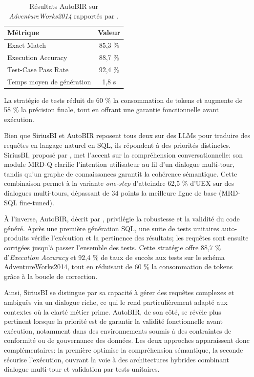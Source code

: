 \documentclass[conference]{IEEEtran}
\begin{document}
\begin{table}[ht]
\centering
\caption{Résultats AutoBIR sur \textit{AdventureWorks2014} rapportés par \citeauthor{busany2024autobir} \citeyearpar{busany2024autobir}.}
\label{tab:autobir-results}
\begin{tabular}{|l|c|}
\hline
\textbf{Métrique} & \textbf{Valeur} \\
\hline
Exact Match                & 85,3 \% \\
Execution Accuracy         & 88,7 \% \\
Test-Case Pass Rate        & 92,4 \% \\
Temps moyen de génération  & 1,8 s \\
\hline
\end{tabular}
\end{table}

La stratégie de tests réduit de 60 \% la consommation de tokens et augmente de 58 \% la précision finale, tout en offrant une garantie fonctionnelle avant exécution.

Bien que SiriusBI et AutoBIR reposent tous deux sur des LLMs pour traduire des requêtes en langage naturel en SQL, ils répondent à des priorités distinctes. SiriusBI, proposé par \citeauthor{jiang2024siriusbi}, met l’accent sur la compréhension conversationnelle: son module MRD-Q clarifie l’intention utilisateur au fil d’un dialogue multi-tour, tandis qu’un graphe de connaissances garantit la cohérence sémantique. Cette combinaison permet à la variante \emph{one-step} d’atteindre 62,5 \% d’UEX sur des dialogues multi-tours, dépassant de 34 points la meilleure ligne de base (MRD-SQL fine-tuned).

À l’inverse, AutoBIR, décrit par \citeauthor{busany2024autobir} \citeyearpar{busany2024autobir}, privilégie la robustesse et la validité du code généré. Après une première génération SQL, une suite de tests unitaires auto-produits vérifie l’exécution et la pertinence des résultats; les requêtes sont ensuite corrigées jusqu’à passer l’ensemble des tests. Cette stratégie offre 88,7 \% d’\emph{Execution Accuracy} et 92,4 \% de taux de succès aux tests sur le schéma AdventureWorks2014, tout en réduisant de 60 \% la consommation de tokens grâce à la boucle de correction.

Ainsi, SiriusBI se distingue par sa capacité à gérer des requêtes complexes et ambiguës via un dialogue riche, ce qui le rend particulièrement adapté aux contextes où la clarté métier prime. AutoBIR, de son côté, se révèle plus pertinent lorsque la priorité est de garantir la validité fonctionnelle avant exécution, notamment dans des environnements soumis à des contraintes de conformité ou de gouvernance des données. Les deux approches apparaissent donc complémentaires: la première optimise la compréhension sémantique, la seconde sécurise l’exécution, ouvrant la voie à des architectures hybrides combinant dialogue multi-tour et validation par tests unitaires.
\end{document}
